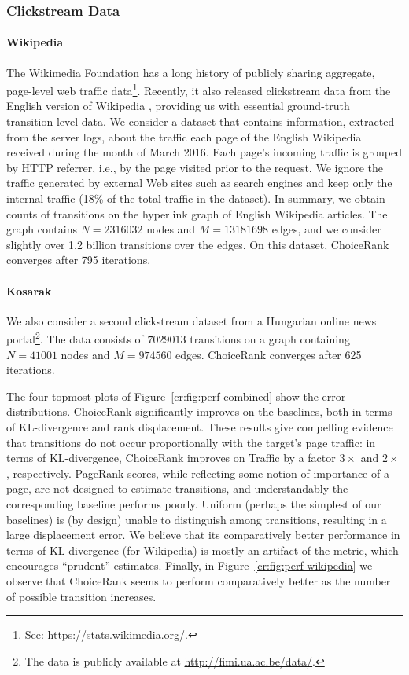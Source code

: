 \subsubsection{Clickstream Data}

\paragraph{Wikipedia}
The Wikimedia Foundation has a long history of publicly sharing aggregate, page-level web traffic data\footnote{See: \url{https://stats.wikimedia.org/}.}.
Recently, it also released clickstream data from the English version of Wikipedia \citep{wulczyn2016wikipedia}, providing us with essential ground-truth transition-level data.
We consider a dataset that contains information, extracted from the server logs, about the traffic each page of the English Wikipedia received during the month of March 2016.
Each page's incoming traffic is grouped by HTTP referrer, i.e., by the page visited prior to the request.
We ignore the traffic generated by external Web sites such as search engines and keep only the internal traffic (\num{18}\% of the total traffic in the dataset).
In summary, we obtain counts of transitions on the hyperlink graph of English Wikipedia articles.
The graph contains $N = \num{2316032}$ nodes and $M = \num{13181698}$ edges, and we consider slightly over \num{1.2} billion transitions over the edges.
On this dataset, ChoiceRank converges after \num{795} iterations.

\paragraph{Kosarak}
We also consider a second clickstream dataset from a Hungarian online news portal\footnote{The data is publicly available at \url{http://fimi.ua.ac.be/data/}.}.
The data consists of $\num{7029013}$ transitions on a graph containing $N = 41001$ nodes and $M = \num{974560}$ edges.
ChoiceRank converges after \num{625} iterations.

The four topmost plots of Figure~\ref{cr:fig:perf-combined} show the error distributions.
ChoiceRank significantly improves on the baselines, both in terms of KL-divergence and rank displacement.
These results give compelling evidence that transitions do not occur proportionally with the target's page traffic: in terms of KL-divergence, ChoiceRank improves on Traffic by a factor $3\times$ and $2\times$, respectively.
PageRank scores, while reflecting some notion of importance of a page, are not designed to estimate transitions, and understandably the corresponding baseline performs poorly.
Uniform (perhaps the simplest of our baselines) is (by design) unable to distinguish among transitions, resulting in a large displacement error.
We believe that its comparatively better performance in terms of KL-divergence (for Wikipedia) is mostly an artifact of the metric, which encourages ``prudent'' estimates.
Finally, in Figure~\ref{cr:fig:perf-wikipedia} we observe that ChoiceRank seems to perform comparatively better as the number of possible transition increases.


